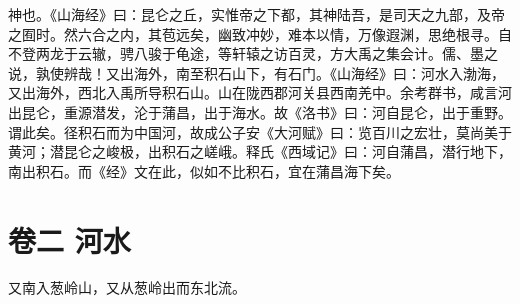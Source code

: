 \documentclass[12pt,UTF8]{ctexbook}
\begin{document}
神也。《山海经》曰：昆仑之丘，实惟帝之下都，其神陆吾，是司天之九部，及帝之囿时。然六合之内，其苞远矣，幽致冲妙，难本以情，万像遐渊，思绝根寻。自不登两龙于云辙，骋八骏于龟途，等轩辕之访百灵，方大禹之集会计。儒、墨之说，孰使辨哉！又出海外，南至积石山下，有石门。《山海经》曰：河水入渤海，又出海外，西北入禹所导积石山。山在陇西郡河关县西南羌中。余考群书，咸言河出昆仑，重源潜发，沦于蒲昌，出于海水。故《洛书》曰：河自昆仑，出于重野。谓此矣。径积石而为中国河，故成公子安《大河赋》曰：览百川之宏壮，莫尚美于黄河；潜昆仑之峻极，出积石之嵯峨。释氏《西域记》曰：河自蒲昌，潜行地下，南出积石。而《经》文在此，似如不比积石，宜在蒲昌海下矣。


\chapter{卷二 河水 }
又南入葱岭山，又从葱岭出而东北流。
\end{document}
